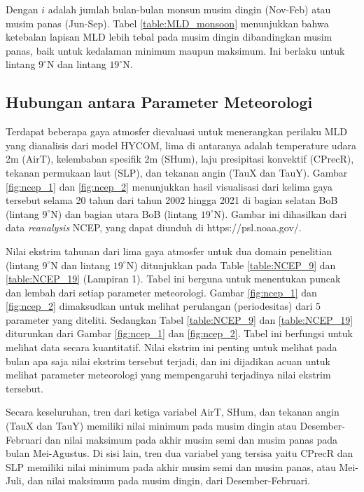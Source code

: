 \begin{spacing}{1.5}
		Dengan $i$ adalah jumlah bulan-bulan monsun musim dingin (Nov-Feb) atau musim panas (Jun-Sep). Tabel \ref{table:MLD_monsoon} menunjukkan bahwa ketebalan lapisan MLD lebih tebal pada musim dingin dibandingkan musim panas, baik untuk kedalaman minimum maupun maksimum. Ini berlaku untuk lintang $9^\circ$N dan lintang $19^\circ$N.
	
\subsection[Hubungan antara Parameter Meteorologi]{Hubungan antara Parameter Meteorologi}
	
		Terdapat beberapa gaya atmosfer dievaluasi untuk menerangkan perilaku MLD yang dianalisis dari model HYCOM, lima di antaranya adalah temperature udara 2m (AirT), kelembaban spesifik 2m (SHum), laju presipitasi konvektif (CPrecR), tekanan permukaan laut (SLP), dan tekanan angin (TauX dan TauY). Gambar \ref{fig:ncep_1} dan \ref{fig:ncep_2} menunjukkan hasil visualisasi dari kelima gaya tersebut selama 20 tahun dari tahun 2002 hingga 2021 di bagian selatan BoB (lintang $9^\circ$N) dan bagian utara BoB (lintang $19^\circ$N). Gambar ini dihasilkan dari data \textit{reanalysis} NCEP, yang dapat diunduh di https://psl.noaa.gov/.
		
		Nilai ekstrim tahunan dari lima gaya atmosfer untuk dua domain penelitian (lintang $9^\circ$N dan lintang $19^\circ$N) ditunjukkan pada Table \ref{table:NCEP_9} dan \ref{table:NCEP_19} (Lampiran 1). Tabel ini berguna untuk menentukan puncak dan lembah dari setiap parameter meteorologi. Gambar \ref{fig:ncep_1} dan \ref{fig:ncep_2} dimaksudkan untuk melihat perulangan (periodesitas) dari 5 parameter yang diteliti. Sedangkan Tabel \ref{table:NCEP_9} dan \ref{table:NCEP_19} diturunkan dari Gambar \ref{fig:ncep_1} dan \ref{fig:ncep_2}. Tabel ini berfungsi untuk melihat data secara kuantitatif. Nilai ekstrim ini penting untuk melihat pada bulan apa saja nilai ekstrim tersebut terjadi, dan ini dijadikan acuan untuk melihat parameter meteorologi yang mempengaruhi terjadinya nilai ekstrim tersebut.
		
		Secara keseluruhan, tren dari ketiga variabel AirT, SHum, dan tekanan angin (TauX dan TauY) memiliki nilai minimum pada musim dingin atau Desember-Februari dan nilai maksimum pada akhir musim semi dan musim panas pada bulan Mei-Agustus. Di sisi lain, tren dua variabel yang tersisa yaitu CPrecR dan SLP memiliki nilai minimum pada akhir musim semi dan musim panas, atau Mei-Juli, dan nilai maksimum pada musim dingin, dari Desember-Februari.
		

\end{spacing}
